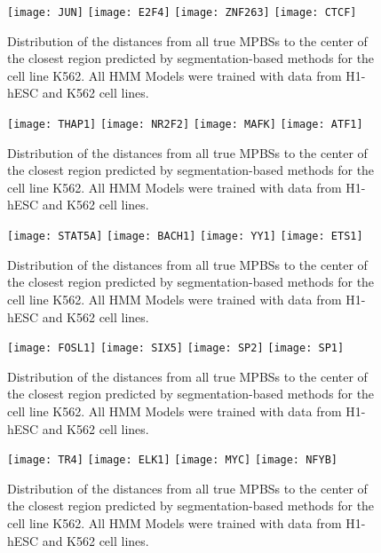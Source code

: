 \documentclass[11pt,a4]{article}
\begin{document}
\begin{figure}[h]
\centering
    \texttt{[image: JUN]}
    \texttt{[image: E2F4]}
    \texttt{[image: ZNF263]}
    \texttt{[image: CTCF]}
\caption{Distribution of the distances from all true MPBSs to the center of the closest region predicted by segmentation-based methods for the cell line K562. All HMM Models were trained with data from H1-hESC and K562 cell lines.}
\label{fig:boxplot.K562.fdr_4.6}
\end{figure}

\begin{figure}[h]
\centering
    \texttt{[image: THAP1]}
    \texttt{[image: NR2F2]}
    \texttt{[image: MAFK]}
    \texttt{[image: ATF1]}
\caption{Distribution of the distances from all true MPBSs to the center of the closest region predicted by segmentation-based methods for the cell line K562. All HMM Models were trained with data from H1-hESC and K562 cell lines.}
\label{fig:boxplot.K562.fdr_4.7}
\end{figure}

\begin{figure}[h]
\centering
    \texttt{[image: STAT5A]}
    \texttt{[image: BACH1]}
    \texttt{[image: YY1]}
    \texttt{[image: ETS1]}
\caption{Distribution of the distances from all true MPBSs to the center of the closest region predicted by segmentation-based methods for the cell line K562. All HMM Models were trained with data from H1-hESC and K562 cell lines.}
\label{fig:boxplot.K562.fdr_4.8}
\end{figure}

\begin{figure}[h]
\centering
    \texttt{[image: FOSL1]}
    \texttt{[image: SIX5]}
    \texttt{[image: SP2]}
    \texttt{[image: SP1]}
\caption{Distribution of the distances from all true MPBSs to the center of the closest region predicted by segmentation-based methods for the cell line K562. All HMM Models were trained with data from H1-hESC and K562 cell lines.}
\label{fig:boxplot.K562.fdr_4.9}
\end{figure}

\begin{figure}[h]
\centering
    \texttt{[image: TR4]}
    \texttt{[image: ELK1]}
    \texttt{[image: MYC]}
    \texttt{[image: NFYB]}
\caption{Distribution of the distances from all true MPBSs to the center of the closest region predicted by segmentation-based methods for the cell line K562. All HMM Models were trained with data from H1-hESC and K562 cell lines.}
\label{fig:boxplot.K562.fdr_4.10}
\end{figure}
\end{document}

